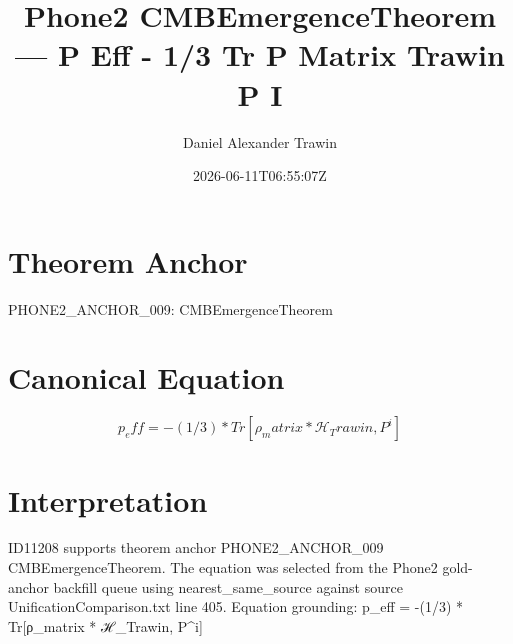 \documentclass[11pt]{article}
\title{Phone2 CMBEmergenceTheorem — P Eff - 1/3 Tr Ρ Matrix Trawin P I}
\author{Daniel Alexander Trawin}
\date{2026-06-11T06:55:07Z}
\begin{document}
\maketitle
\section*{Theorem Anchor}
PHONE2_ANCHOR_009: CMBEmergenceTheorem
\section*{Canonical Equation}
\[
p_eff = -(1/3) * Tr[ρ_matrix * {ℋ_Trawin, P^i}]
\]
\section*{Interpretation}
ID11208 supports theorem anchor PHONE2_ANCHOR_009 CMBEmergenceTheorem. The equation was selected from the Phone2 gold-anchor backfill queue using nearest_same_source against source UnificationComparison.txt line 405. Equation grounding: p_eff = -(1/3) * Tr[ρ_matrix * {ℋ_Trawin, P^i}]
\end{document}
